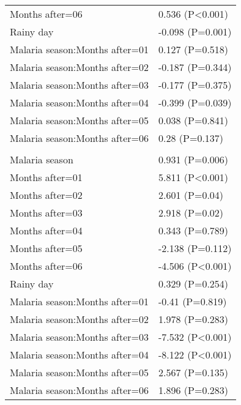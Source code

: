 \documentclass[]{article}
\begin{document}
\begin{longtable}[t]{ll}
\hspace{1em}Months after=06 & 0.536 (P<0.001)\\
\hspace{1em}Rainy day & -0.098 (P=0.001)\\
\hspace{1em}Malaria season:Months after=01 & 0.127 (P=0.518)\\
\hspace{1em}Malaria season:Months after=02 & -0.187 (P=0.344)\\
\hspace{1em}Malaria season:Months after=03 & -0.177 (P=0.375)\\
\hspace{1em}Malaria season:Months after=04 & -0.399 (P=0.039)\\
\hspace{1em}Malaria season:Months after=05 & 0.038 (P=0.841)\\
\hspace{1em}Malaria season:Months after=06 & 0.28 (P=0.137)\\
\addlinespace[1.5em]
\multicolumn{2}{l}{\textbf{Temporary not field worker}}\\
\hspace{1em}Malaria season & 0.931 (P=0.006)\\
\hspace{1em}Months after=01 & 5.811 (P<0.001)\\
\hspace{1em}Months after=02 & 2.601 (P=0.04)\\
\hspace{1em}Months after=03 & 2.918 (P=0.02)\\
\hspace{1em}Months after=04 & 0.343 (P=0.789)\\
\hspace{1em}Months after=05 & -2.138 (P=0.112)\\
\hspace{1em}Months after=06 & -4.506 (P<0.001)\\
\hspace{1em}Rainy day & 0.329 (P=0.254)\\
\hspace{1em}Malaria season:Months after=01 & -0.41 (P=0.819)\\
\hspace{1em}Malaria season:Months after=02 & 1.978 (P=0.283)\\
\hspace{1em}Malaria season:Months after=03 & -7.532 (P<0.001)\\
\hspace{1em}Malaria season:Months after=04 & -8.122 (P<0.001)\\
\hspace{1em}Malaria season:Months after=05 & 2.567 (P=0.135)\\
\hspace{1em}Malaria season:Months after=06 & 1.896 (P=0.283)\\*
\end{longtable}
\end{document}
